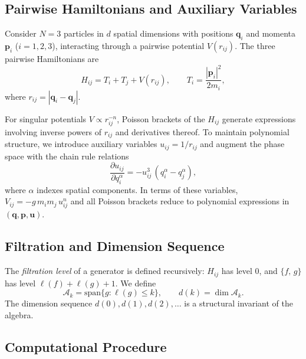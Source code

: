 \documentclass[aps,prl,twocolumn,superscriptaddress,showpacs]{revtex4-2}
\newcommand{\PB}[2]{\{#1,\,#2\}}
\newcommand{\calA}{\mathcal{A}}
\begin{document}
\subsection{Pairwise Hamiltonians and Auxiliary Variables}

Consider $N = 3$ particles in $d$ spatial dimensions with positions
$\bm{q}_i$ and momenta $\bm{p}_i$ ($i = 1, 2, 3$), interacting through
a pairwise potential $V(r_{ij})$.  The three pairwise Hamiltonians are
\begin{equation}
  H_{ij} = T_i + T_j + V(r_{ij}),
  \qquad T_i = \frac{|\bm{p}_i|^2}{2m_i},
  \label{eq:Hij}
\end{equation}
where $r_{ij} = |\bm{q}_i - \bm{q}_j|$.

For singular potentials $V \propto r_{ij}^{-n}$, Poisson brackets of
the $H_{ij}$ generate expressions involving inverse powers of
$r_{ij}$ and derivatives thereof.  To maintain polynomial structure,
we introduce auxiliary variables $u_{ij} = 1/r_{ij}$ and augment the
phase space with the chain rule relations
\begin{equation}
  \frac{\partial u_{ij}}{\partial q_i^{\alpha}}
  = -u_{ij}^3 \, (q_i^{\alpha} - q_j^{\alpha}),
  \label{eq:chainrule}
\end{equation}
where $\alpha$ indexes spatial components.  In terms of these variables,
$V_{ij} = -g \, m_i m_j \, u_{ij}^n$ and all Poisson brackets reduce to
polynomial expressions in $(\bm{q}, \bm{p}, \bm{u})$.

\subsection{Filtration and Dimension Sequence}

The \emph{filtration level} of a generator is defined recursively:
$H_{ij}$ has level 0, and $\PB{f}{g}$ has level
$\ell(f) + \ell(g) + 1$.  We define
\begin{equation}
  \calA_k = \mathrm{span}\{g : \ell(g) \leq k\},
  \qquad d(k) = \dim \calA_k.
  \label{eq:filtration}
\end{equation}
The dimension sequence $d(0), d(1), d(2), \ldots$ is a structural
invariant of the algebra.

\subsection{Computational Procedure}
\end{document}
